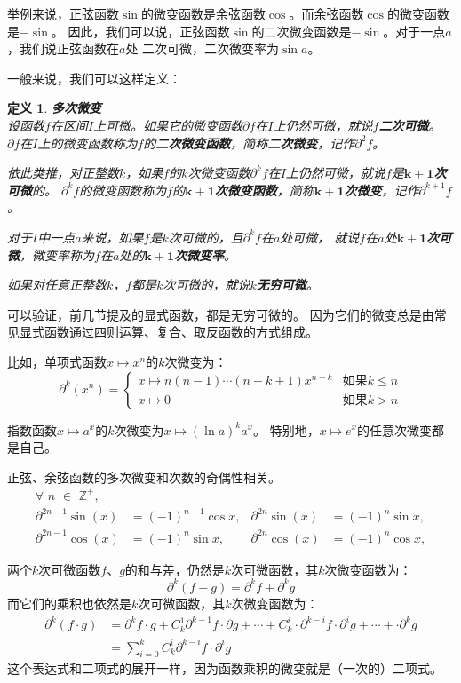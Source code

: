 \documentclass[12pt,UTF8]{ctexbook}
\newtheorem{df}{定义}[section]
\begin{document}
举例来说，正弦函数$\sin$的微变函数是余弦函数$\cos$。而余弦函数$\cos$的微变函数是$-\sin$。
因此，我们可以说，正弦函数$\sin$的二次微变函数是$-\sin$。对于一点$a$，我们说正弦函数在$a$处
二次可微，二次微变率为$\sin{a}$。

一般来说，我们可以这样定义：
\begin{df}{\textbf{多次微变}}
    \mbox{} \\
    设函数$f$在区间$I$上可微。如果它的微变函数$\partial f$在$I$上仍然可微，就说$f$\textbf{二次可微}。
    $\partial f$在$I$上的微变函数称为$f$的\textbf{二次微变函数}，简称\textbf{二次微变}，记作$\partial^2 f$。
    
    依此类推，对正整数$k$，如果$f$的$k$次微变函数$\partial^k f$在$I$上仍然可微，就说$f$是$\boldsymbol{k+1}$\textbf{次可微}的。
    $\partial^k f$的微变函数称为$f$的$\boldsymbol{k+1}$\textbf{次微变函数}，简称$\boldsymbol{k+1}$\textbf{次微变}，记作$\partial^{k+1} f$。

    对于$I$中一点$a$来说，如果$f$是$k$次可微的，且$\partial^k f$在$a$处可微，
    就说$f$在$a$处$\boldsymbol{k+1}$\textbf{次可微}，微变率称为$f$在$a$处的$\boldsymbol{k+1}$\textbf{次微变率}。

    如果对任意正整数$k$，$f$都是$k$次可微的，就说$k$\textbf{无穷可微}。
\end{df}

可以验证，前几节提及的显式函数，都是无穷可微的。
因为它们的微变总是由常见显式函数通过四则运算、复合、取反函数的方式组成。

比如，单项式函数$x\mapsto x^n$的$k$次微变为：
$$ \partial^k (x^n) = \left\{
    \begin{array}{ll}
        x\mapsto n(n-1)\cdots(n-k+1) x^{n-k} & \mbox{如果} k \leqslant n \\
        x\mapsto 0 & \mbox{如果} k > n
    \end{array}\right.
$$

指数函数$x\mapsto a^x$的$k$次微变为$x\mapsto (\ln{a})^k a^x$。
特别地，$x\mapsto e^x$的任意次微变都是自己。

正弦、余弦函数的多次微变和次数的奇偶性相关。
\begin{align*}
    \forall \,\,n\,\,\in\,\,\mathbb{Z}^+, \\
    \partial^{2n-1} \sin(x) &= (-1)^{n-1} \cos{x}, & \partial^{2n} \sin(x) &= (-1)^{n} \sin{x},  \\
    \partial^{2n-1} \cos(x) &= (-1)^{n} \sin{x}, & \partial^{2n} \cos(x) &= (-1)^{n} \cos{x},  
\end{align*}

两个$k$次可微函数$f$、$g$的和与差，仍然是$k$次可微函数，其$k$次微变函数为：
$$ \partial^k (f \pm g) = \partial^k f \pm \partial^k g $$
而它们的乘积也依然是$k$次可微函数，其$k$次微变函数为：
\begin{align*}
    \partial^k (f \cdot g) &= \partial^k f \cdot g + C_k^1 \partial^{k-1} f \cdot \partial g + \cdots + C_k^i \cdot \partial^{k-i} f \cdot  \partial^i g + \cdots + \cdot \partial^{k} g  \\
    &= \sum_{i=0}^k C_k^i \partial^{k-i} f \cdot  \partial^i g 
\end{align*}
这个表达式和二项式的展开一样，因为函数乘积的微变就是（一次的）二项式。
\end{document}
